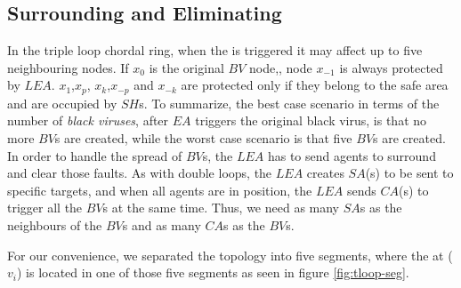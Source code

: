\subsection{Surrounding and Eliminating}

 

In the triple loop chordal ring, when the \bv is triggered it may affect up to five  neighbouring nodes.
If $x_0$ is the original $BV$ node,, node $x_{-1}$ is always protected by $LEA$. $x_{1} $,$x_{p} $, $x_{k}$,$x_{-p} $ and $x_{-k}$ are  protected only if they belong to the safe area and are occupied by $SH$s.
To summarize, the best case scenario in terms of the number of  {\it black viruses}, after $EA$ triggers the original black virus, is that no more $BV$s are created, while the worst case scenario is that five $BV$s are created.  \\In order to handle the spread of $BV$s, the $LEA$ has to send agents to surround and clear those faults. 
As with double loops, the $LEA$ creates $SA$(s) to be sent to specific targets, and when all agents are in position, the $LEA$ sends $CA$(s) to trigger all the $BV$s at the same time. Thus, we need as many $SA$s as the neighbours of the $BV$s and as many $CA$s as the $BV$s. 



For our convenience, we separated the topology into five segments, where the  \bv at ($v_i$) is located in one of those five segments as seen in figure \ref{fig:tloop-seg}.

